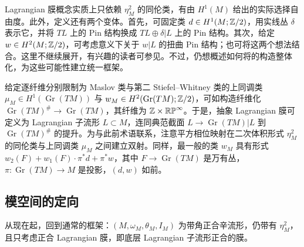 \begin{note}\label{st:12.1}
Lagrangian 膜概念实质上只依赖 $\eta_M^2$ 的同伦类，有由 $H^1(M)$ 给出的实际选择自由度。此外，定义还有两个变体。首先，可固定类
$d\in H^1(M;\mathbb Z/2)$，用实线丛 $\delta$ 表示它，并将 $TL$ 上的 Pin 结构换成 $TL\oplus\delta|L$ 上的 Pin 结构。其次，给定 $w\in H^2(M;\mathbb Z/2)$，可考虑意义下关于 $w|L$ 的扭曲 Pin 结构；也可将这两个想法结合。这里不继续展开，有兴趣的读者可参见。不过，仍想概述如何将的构造整体化，为这些可能性建立统一框架。

给定逐纤维分别限制为 Maslov 类与第二 Stiefel–Whitney 类的上同调类 $\mu_M\in H^1(\operatorname{Gr}(TM))$ 与 $w_M\in H^2(\operatorname{Gr}(TM);\mathbb Z/2)$，可如构造纤维化 $\operatorname{Gr}(TM)^\#\to\operatorname{Gr}(TM)$，其纤维为 $\mathbb Z\times\mathbb{RP}^\infty$。于是，抽象 Lagrangian 膜可定义为 Lagrangian 子流形 $L\subset M$，连同典范截面 $L\to\operatorname{Gr}(TM)|L$ 到 $\operatorname{Gr}(TM)^\#$ 的提升。为与此前术语联系，注意平方相位映射在二次体积形式 $\eta_M^2$ 的同伦类与上同调类 $\mu_M$ 之间建立双射。同样，最一般的类 $w_M$ 具有形式 $w_2(F)+w_1(F)\cdot\pi^*d+\pi^*w$，其中 $F\to\operatorname{Gr}(TM)$ 是万有丛，$\pi:\operatorname{Gr}(TM)\to M$ 是投影，$(d,\allowbreak w)$ 如前。
\end{note}

\subsection{模空间的定向}\label{sec:12b}
从现在起，回到通常的框架：$(M,\allowbreak \omega_M,\allowbreak \theta_M,\allowbreak I_M)$ 为带角正合辛流形，仍带有 $\eta_M^2$，且只考虑正合 Lagrangian 膜，即底层 Lagrangian 子流形正合的膜。

